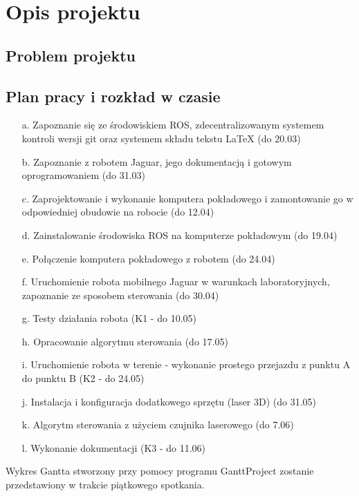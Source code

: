 \section{Opis projektu}

\subsection{Problem projektu}
	
	
\subsection{Plan pracy i rozkład w czasie}
\begin{enumerate}
\item[a.] Zapoznanie się ze środowiskiem ROS, zdecentralizowanym systemem kontroli wersji git oraz systemem składu tekstu LaTeX (do 20.03)
\item[b.] Zapoznanie z robotem Jaguar, jego dokumentacją i gotowym oprogramowaniem (do 31.03)
\item[c.] Zaprojektowanie i wykonanie komputera pokładowego i zamontowanie go w odpowiedniej obudowie na robocie (do 12.04)
\item[d.] Zainstalowanie środowiska ROS na komputerze pokładowym (do 19.04)
\item[e.] Połączenie komputera pokładowego z robotem (do 24.04)
\item[f.] Uruchomienie robota mobilnego Jaguar w warunkach laboratoryjnych, zapoznanie ze sposobem sterowania (do 30.04)
\item[g.] Testy działania robota (K1 - do 10.05)
\item[h.] Opracowanie algorytmu sterowania (do 17.05)
\item[i.] Uruchomienie robota w terenie - wykonanie prostego przejazdu z punktu A do punktu B (K2 - do 24.05)
\item[j.] Instalacja i konfiguracja dodatkowego sprzętu (laser 3D) (do 31.05)
\item[k.] Algorytm sterowania z użyciem czujnika laserowego (do 7.06)
\item[l.] Wykonanie dokumentacji (K3 - do 11.06)
\end{enumerate}

Wykres Gantta stworzony przy pomocy programu GanttProject zostanie przedstawiony w trakcie piątkowego spotkania.
		
	
